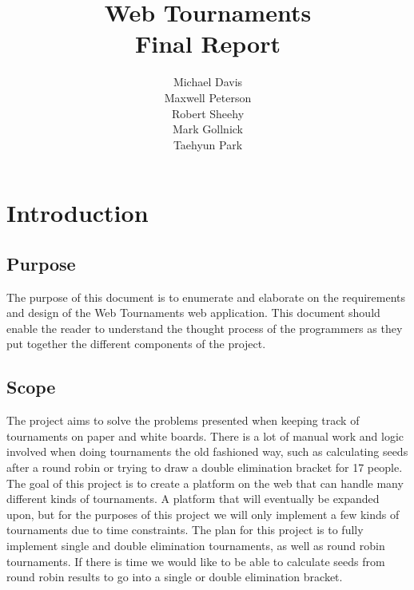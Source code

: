 \documentclass{article}
\author{Michael Davis 	\\
		Maxwell Peterson \\
		Robert Sheehy 	\\
		Mark Gollnick 	\\
		Taehyun Park	}
\title{Web Tournaments \\
	   Final Report}
\begin{document}
\maketitle



\newpage
\section{Introduction}

\subsection{Purpose}
The purpose of this document is to enumerate and elaborate on the requirements and design of the Web Tournaments web application. This document should enable the reader to understand the thought process of the programmers as they put together the different components of the project.

\subsection{Scope}
The project aims to solve the problems presented when keeping track of tournaments on paper and white boards. There is a lot of manual work and logic involved when doing tournaments the old fashioned way, such as calculating seeds after a round robin or trying to draw a double elimination bracket for 17 people. The goal of this project is to create a platform on the web that can handle many different kinds of tournaments. A platform that will eventually be expanded upon, but for the purposes of this project we will only implement a few kinds of tournaments due to time constraints. The plan for this project is to fully implement single and double elimination tournaments, as well as round robin tournaments. If there is time we would like to be able to calculate seeds from round robin results to go into a single or double elimination bracket.
\end{document}
